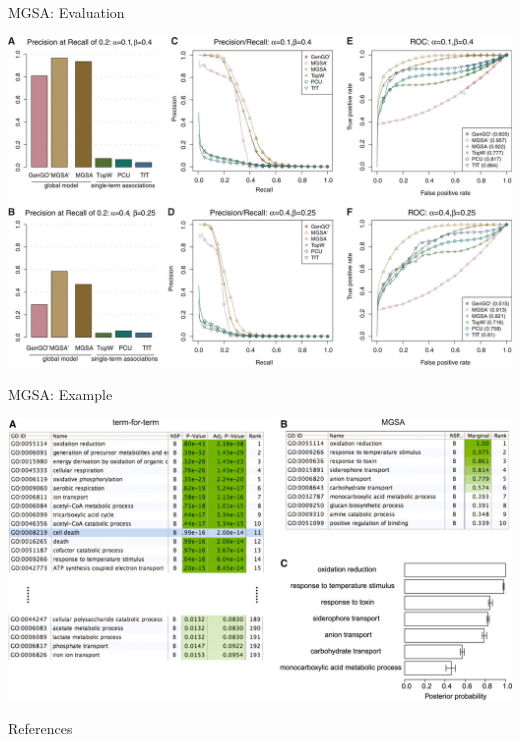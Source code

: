 \documentclass{beamer}
\begin{document}
\begin{frame}{MGSA: Evaluation}

\includegraphics[width=1\textwidth]{img/mgsa-F2.jpg} 
\end{frame}

\begin{frame}{MGSA: Example}

\includegraphics[width=1\textwidth]{img/mgsa-F3.jpg} 
\end{frame}

\appendix

\begin{frame}{References}
	\nocite{*} %
	
	
\end{frame}
\end{document}

